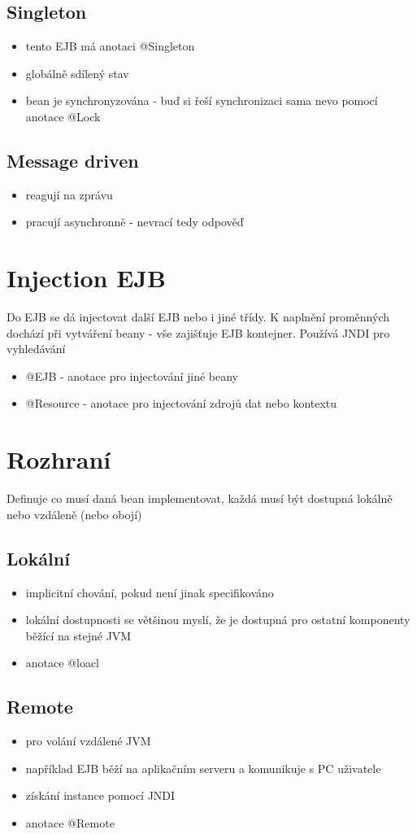 \documentclass{szzclass}
\begin{document}
\subsection{Singleton}
\begin{itemize}
    \item tento EJB má anotaci @Singleton
    \item globálně sdílený stav
    \item bean je synchronyzována - buď si řeší synchronizaci sama nevo pomocí anotace @Lock
\end{itemize}
\subsection{Message driven}
\begin{itemize}
    \item reagují na zprávu
    \item pracují asynchronně - nevrací tedy odpověď
\end{itemize}
\section{Injection EJB}
Do EJB se dá injectovat další EJB nebo i jiné třídy. K naplnění proměnných dochází při vytváření beany - vše zajišťuje EJB kontejner.
Používá JNDI pro vyhledávání
\begin{itemize}
    \item @EJB - anotace pro injectování jiné beany
    \item @Resource - anotace pro injectování zdrojů dat nebo kontextu
\end{itemize}
\section{Rozhraní}
Definuje co musí daná bean implementovat, každá musí být dostupná lokálně nebo vzdáleně (nebo obojí)
\subsection{Lokální}
\begin{itemize}
    \item implicitní chování, pokud není jinak specifikováno
    \item lokální dostupnosti se většinou myslí, že je dostupná pro ostatní komponenty běžící na stejné JVM
    \item anotace @loacl
\end{itemize}
\subsection{Remote}
\begin{itemize}
    \item pro volání vzdálené JVM
    \item například EJB běží na aplikačním serveru a komunikuje s PC uživatele
    \item získání instance pomocí JNDI
    \item anotace @Remote
\end{itemize}
\end{document}
